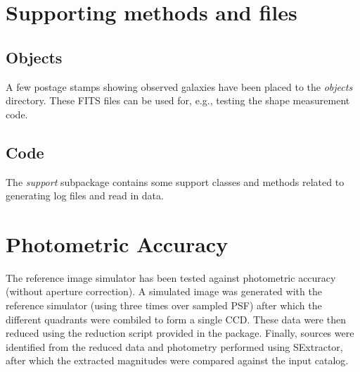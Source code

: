 \documentclass[a4paper,11pt,english]{sphinxmanual}
\begin{document}
\chapter{Supporting methods and files}
\label{index:supporting-methods-and-files}

\section{Objects}
\label{index:objects}
A few postage stamps showing observed galaxies have been placed to the \emph{objects} directory. These FITS files
can be used for, e.g., testing the shape measurement code.


\section{Code}
\label{index:code}
The \emph{support} subpackage contains some support classes and methods related to generating log files and read in
data.


\chapter{Photometric Accuracy}
\label{index:photometric-accuracy}
The reference image simulator has been tested against photometric accuracy (without aperture correction). A
simulated image was generated with the reference simulator (using three times over sampled PSF) after
which the different quadrants were combiled to form a single CCD. These data were then reduced using the
reduction script provided in the package. Finally, sources were identified from the reduced data and photometry performed
using SExtractor, after which the extracted magnitudes were compared against the input catalog.
\end{document}
